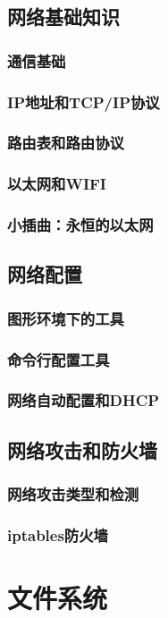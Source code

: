 \documentclass[amstex,twoside]{ctexbook}
\begin{document}
\section{  网络基础知识}
\subsection{  通信基础}
\subsection{  IP地址和TCP/IP协议}
\subsection{  路由表和路由协议}
\subsection{ 以太网和WIFI}
\subsection*{  小插曲：永恒的以太网}

\section{网络配置\label{sec:ifconfig}}
\subsection{  图形环境下的工具	}
\subsection{ 命令行配置工具}
\subsection{ 网络自动配置和DHCP}
\section{  网络攻击和防火墙	}
\subsection{ 网络攻击类型和检测}
\subsection{  iptables防火墙}

\chapter{文件系统}
\end{document}
